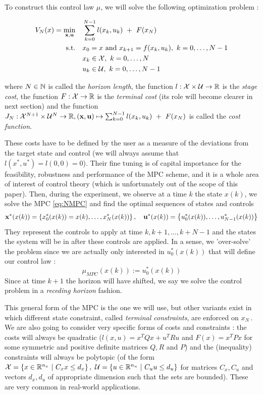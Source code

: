 \documentclass[12pt]{article}
\begin{document}
\noindent To construct this control law $\mu$, we will solve the following optimization problem :

\begin{align}
	\begin{split}
		\label{eq:NMPC}
		V_N(x)=\underset{\bf{x},\bf{u}}{\min} &\quad \sum_{k=0}^{N-1}l(x_k,u_k)~+~F(x_N)\\
		\text{s.t.} &\quad x_0=x\text{ and }x_{k+1}=f(x_k,u_k),~k=0,\dots,N-1\\
		&\quad x_k\in\cal{X},~k=0,\dots,N\\
		&\quad u_k\in\cal{U},~k=0,\dots,N-1
	\end{split}
\end{align}

\noindent where $N\in\N$ is called the \textit{horizon length}, the function $l:\cal{X}\times\cal{U}\to\R$ is the \textit{stage cost}, the function $F:\cal{X}\to\R$ is the \textit{terminal cost} (its role will become clearer in next section) and the function $J_N:\cal{X}^{N+1}\times\cal{U}^N\to\R, (\bf{x},\bf{u})\mapsto\sum_{k=0}^{N-1}l(x_k,u_k)~+~F(x_N)$ is called the \textit{cost function}.

\vspace{12pt}

These costs have to be defined by the user as a measure of the deviations from the target state and control (we will always assume that $l(x^*,u^*)=l(0,0)=0$).
Their fine tuning is of capital importance for the feasibility, robustness and performance of the MPC scheme, and it is a whole area of interest of control theory (which is unfortunately out of the scope of this paper).
Then, during the experiment, we observe at a time $k$ the state $x(k)$, we solve the MPC \ref{eq:NMPC} and find the optimal sequences of states and controls $$\bf{x}^*(x(k))=\left\{ x_0^*(x(k))=x(k),\dots,x_N^*(x(k))\right\},\quad \bf{u}^*(x(k))=\left\{ u_0^*(x(k)),\dots,u_{N-1}^*(x(k))\right\}$$
They represent the controls to apply at time $k,k+1,\dots,k+N-1$ and the states the system will be in after these controls are applied.
In a sense, we 'over-solve' the problem since we are actually only interested in $u_0^*(x(k))$ that will define our control law :
$$\mu_{MPC}(x(k)):=u_0^*(x(k))$$
Since at time $k+1$ the horizon will have shifted, we say we solve the control problem in a \textit{receding horizon} fashion.

\vspace{12pt}

This general form of the MPC is the one we will use, but other variants exist in which different state constraint, called \textit{terminal constraints}, are enforced on $x_N$\,.
We are also going to consider very specific forms of costs and constraints : the costs will always be quadratic ($l(x,u)=x^TQx+u^TRu$ and $F(x)=x^TPx$ for some symmetric and positive definite matrices $Q,R$ and $P$) and the (inequality) constraints will always be polytopic (of the form $\cal{X}=\left\{x\in\R^{n_x}~|~C_xx\leq d_x\right\},~\cal{U}=\left\{u\in\R^{n_u}~|~C_uu\leq d_u\right\}$ for matrices $C_x,C_u$ and vectors $d_x,d_u$ of appropriate dimension such that the sets are bounded).
These are very common in real-world applications.
\end{document}

